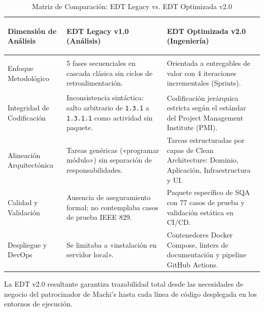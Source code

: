 \begin{table}[H]
\centering
\small
\caption{Matriz de Comparación: EDT Legacy vs. EDT Optimizada v2.0}
\label{tab:comparacion_edt}
\begin{tabularx}{\textwidth}{>{\bfseries\raggedright}p{3.8cm} >{\raggedright}p{4.8cm} Y}
\toprule
\textbf{Dimensión de Análisis} & \textbf{EDT Legacy v1.0 (Análisis)} & \textbf{EDT Optimizada v2.0 (Ingeniería)} \\
\midrule
Enfoque Metodológico & 5 fases secuenciales en cascada clásica sin ciclos de retroalimentación. & Orientada a entregables de valor con 4 iteraciones incrementales (Sprints). \\
\addlinespace
Integridad de Codificación & Inconsistencia sintáctica: salto arbitrario de \texttt{1.3.1} a \texttt{1.3.1.1} como actividad sin paquete. & Codificación jerárquica estricta según el estándar del Project Management Institute (PMI). \\
\addlinespace
Alineación Arquitectónica & Tareas genéricas («programar módulo») sin separación de responsabilidades. & Tareas estructuradas por capas de Clean Architecture: Dominio, Aplicación, Infraestructura y UI. \\
\addlinespace
Calidad y Validación & Ausencia de aseguramiento formal; no contemplaba casos de prueba IEEE 829. & Paquete específico de SQA con 77 casos de prueba y validación estática en CI/CD. \\
\addlinespace
Despliegue y DevOps & Se limitaba a «instalación en servidor local». & Contenedores Docker Compose, linters de documentación y pipeline GitHub Actions. \\
\bottomrule
\end{tabularx}
\end{table}

La EDT v2.0 resultante garantiza trazabilidad total desde las necesidades de negocio del patrocinador de Machi's hasta cada línea de código desplegada en los entornos de ejecución.
